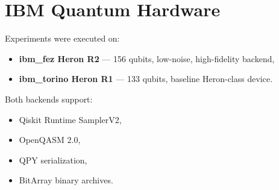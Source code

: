 \section{IBM Quantum Hardware}

Experiments were executed on:
\begin{itemize}
    \item \textbf{ibm\_fez Heron R2} — 156 qubits, low-noise, high-fidelity backend,
    \item \textbf{ibm\_torino Heron R1} — 133 qubits, baseline Heron-class device.
\end{itemize}

Both backends support:
\begin{itemize}
    \item Qiskit Runtime SamplerV2,
    \item OpenQASM 2.0,
    \item QPY serialization,
    \item BitArray binary archives.
\end{itemize}
